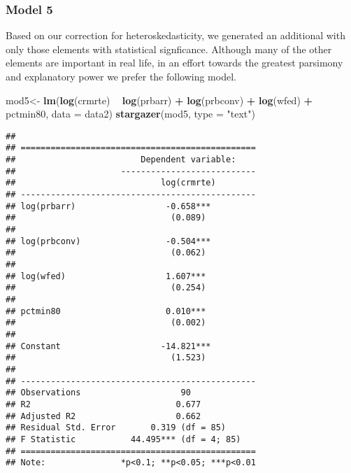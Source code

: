 \documentclass[]{article}
\newenvironment{Shaded}{\begin{snugshade}}{\end{snugshade}}
\newcommand{\DataTypeTok}[1]{\textcolor[rgb]{0.13,0.29,0.53}{#1}}
\newcommand{\KeywordTok}[1]{\textcolor[rgb]{0.13,0.29,0.53}{\textbf{#1}}}
\newcommand{\NormalTok}[1]{#1}
\newcommand{\OperatorTok}[1]{\textcolor[rgb]{0.81,0.36,0.00}{\textbf{#1}}}
\newcommand{\StringTok}[1]{\textcolor[rgb]{0.31,0.60,0.02}{#1}}
\begin{document}
\hypertarget{model-5}{%
\subsubsection{Model 5}\label{model-5}}

Based on our correction for heteroskedasticity, we generated an
additional with only those elements with statistical signficance.
Although many of the other elements are important in real life, in an
effort towards the greatest parsimony and explanatory power we prefer
the following model.

\begin{Shaded}
\begin{Highlighting}[]
\NormalTok{mod5<-}\StringTok{ }\KeywordTok{lm}\NormalTok{(}\KeywordTok{log}\NormalTok{(crmrte) }\OperatorTok{~}\StringTok{ }\KeywordTok{log}\NormalTok{(prbarr) }\OperatorTok{+}\StringTok{ }\KeywordTok{log}\NormalTok{(prbconv) }\OperatorTok{+}\StringTok{ }\KeywordTok{log}\NormalTok{(wfed) }\OperatorTok{+}\StringTok{ }\NormalTok{pctmin80, }\DataTypeTok{data =}\NormalTok{ data2)}
\KeywordTok{stargazer}\NormalTok{(mod5, }\DataTypeTok{type =} \StringTok{"text"}\NormalTok{)}
\end{Highlighting}
\end{Shaded}

\begin{verbatim}
## 
## ===============================================
##                         Dependent variable:    
##                     ---------------------------
##                             log(crmrte)        
## -----------------------------------------------
## log(prbarr)                  -0.658***         
##                               (0.089)          
##                                                
## log(prbconv)                 -0.504***         
##                               (0.062)          
##                                                
## log(wfed)                    1.607***          
##                               (0.254)          
##                                                
## pctmin80                     0.010***          
##                               (0.002)          
##                                                
## Constant                    -14.821***         
##                               (1.523)          
##                                                
## -----------------------------------------------
## Observations                    90             
## R2                             0.677           
## Adjusted R2                    0.662           
## Residual Std. Error       0.319 (df = 85)      
## F Statistic           44.495*** (df = 4; 85)   
## ===============================================
## Note:               *p<0.1; **p<0.05; ***p<0.01
\end{verbatim}
\end{document}
